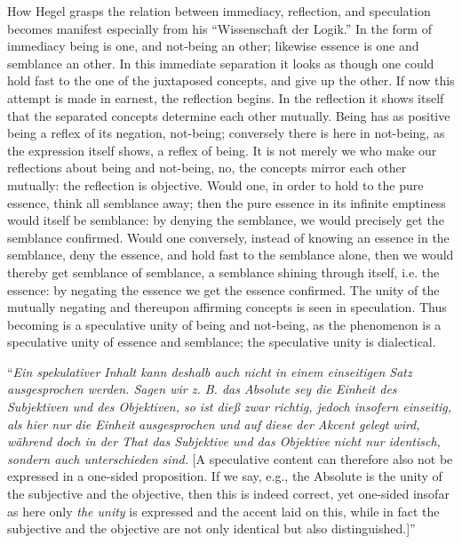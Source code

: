 \documentclass[12pt]{book}
\begin{document}
How Hegel grasps the relation between immediacy, reflection, and speculation becomes manifest
especially from his ``Wissenschaft der Logik.'' In the form of immediacy being is one, and not-being an
other; likewise essence is one and semblance an other. In this immediate separation it looks as though
one could hold fast to the one of the juxtaposed concepts, and give up the other. If now this attempt
is made in
earnest, the reflection begins. In the reflection it shows itself that the separated concepts determine
each other mutually. Being has as positive being a reflex of its negation, not-being; conversely there
is here in not-being, as the expression itself shows, a reflex of being. It is not merely we who make
our reflections about being and not-being, no, the concepts mirror each other mutually: the reflection
is objective. Would one, in order to hold to the pure essence, think all semblance away; then the pure
essence in its infinite emptiness would itself be semblance: by denying the semblance, we would
precisely get the semblance confirmed. Would one conversely, instead of knowing an essence in the
semblance, deny the essence, and hold fast to the semblance alone, then we would thereby get semblance
of semblance, a semblance shining through itself, i.e. the essence: by negating the essence we get the
essence confirmed. The unity of the mutually negating and thereupon affirming concepts is seen in
speculation. Thus becoming is a speculative unity of being and not-being, as the phenomenon is a
speculative unity of essence and semblance; the speculative unity is dialectical.

``\textit{Ein spekulativer Inhalt kann deshalb auch nicht in einem einseitigen Satz ausgesprochen
werden. Sagen wir z. B. das Absolute sey die Einheit des Subjektiven und des Objektiven, so ist dieß
zwar richtig, jedoch insofern einseitig, als hier nur} \emph{die Einheit} \textit{ausgesprochen und
auf diese der Akcent gelegt wird, während doch in der That das Subjektive und das Objektive nicht nur
identisch, sondern auch unterschieden sind.} [A speculative content can therefore also not be expressed
in a one-sided proposition. If we say, e.g., the Absolute is the unity of the subjective and the
objective, then this is indeed correct, yet one-sided insofar as here only \emph{the unity} is
expressed and the accent laid on this, while in fact the subjective and the objective are not only
identical but also distinguished.]''
\end{document}
